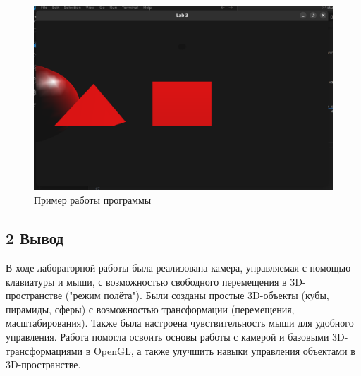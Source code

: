 \documentclass[12pt]{article}
\begin{document}
\begin{figure}[h]

\centering
        
\includegraphics[width=1.0\linewidth]{image.png}
        
\caption{Пример работы программы}
        
\label{fig:mpr}
        
\end{figure}

\subsection*{2 Вывод}
В ходе лабораторной работы была реализована камера, управляемая с помощью клавиатуры и мыши, с возможностью свободного перемещения в 3D-пространстве ("режим полёта"). 
Были созданы простые 3D-объекты (кубы, пирамиды, сферы) с возможностью трансформации (перемещения, масштабирования). Также была настроена чувствительность мыши для удобного управления.
Работа помогла освоить основы работы с камерой и базовыми 3D-трансформациями в OpenGL, а также улучшить навыки управления объектами в 3D-пространстве.
\end{document}
